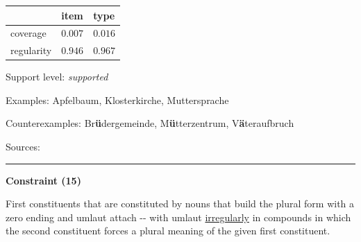 \vspace{-0.35em}

\begin{table}[!ht]
\begin{center}

\begin{tabularx}{\columnwidth}{|X|X|X|}
\hline
 & item & type \\
\hline
 coverage & $0.007$ & $0.016$ \\
\hline
 regularity & $0.946$ & $0.967$ \\
\hline
\end{tabularx}
\end{center}
\end{table}

\vspace{-1.35em}

\noindent
Support level: \textit{supported}

\vspace{0.3em}

\noindent
Examples: Apfel{\zeroLinker}baum, Kloster{\zeroLinker}kirche, Mutter{\zeroLinker}sprache

\noindent
Counterexamples: Br\textbf{ü}der{\zeroLinker}gemeinde, M\textbf{ü}tter{\zeroLinker}zentrum, V\textbf{ä}ter{\zeroLinker}aufbruch

\vspace{0.3em}

\noindent
Sources: \citet[83, 106]{ortner_mueller-bollhagen_1991}


\hrule




\vspace{0.4em}

\begin{center}
\textbf{Constraint (15)}
\end{center}

\noindent
First constituents that are constituted by nouns that build the plural form with a zero ending and umlaut attach \mbox{-{\zeroLinker}-} with umlaut \underline{irregularly} in compounds in which the second constituent forces a plural meaning of the given first constituent.
\vspace{0.35em}



